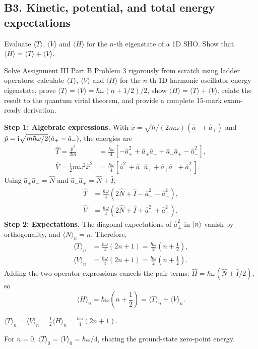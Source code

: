 \documentclass[11pt,a4paper]{article}
\newcommand{\key}[1]{\begin{resultbox}\centering\(\displaystyle #1\)\end{resultbox}}
\newcommand{\avg}[1]{\langle #1\rangle}\newcommand{\Sch}{Schr\"odinger}
\begin{document}
\subsection{B3. Kinetic, potential, and total energy expectations}
\begin{questionbox}
Evaluate \(\langle T\rangle\), \(\langle V\rangle\) and \(\langle H\rangle\) for the \(n\)-th eigenstate of a 1D SHO. Show that \(\langle H\rangle=\langle T\rangle+\langle V\rangle\).
\end{questionbox}
\begin{studybox}
Solve Assignment III Part B Problem 3 rigorously from scratch using ladder operators: calculate \(\langle T\rangle\), \(\langle V\rangle\) and \(\langle H\rangle\) for the \(n\)-th 1D harmonic oscillator energy eigenstate, prove \(\langle T\rangle=\langle V\rangle=\hbar\omega(n+1/2)/2\), show \(\langle H\rangle=\langle T\rangle+\langle V\rangle\), relate the result to the quantum virial theorem, and provide a complete 15-mark exam-ready derivation.
\end{studybox}
\textbf{Step 1: Algebraic expressions.} With
\(\hat x=\sqrt{\hbar/(2m\omega)}(\hat a_-+\hat a_+)\) and
\(\hat p=\mathrm{i}\sqrt{m\hbar\omega/2}(\hat a_+-\hat a_-)\), the energies are
\begin{align}
\hat T=\frac{\hat p^2}{2m}&=\frac{\hbar\omega}{4}\left[-\hat a_+^2+\hat a_+\hat a_-+\hat a_-\hat a_+-\hat a_-^2\right],\\
\hat V=\frac12m\omega^2\hat x^2&=\frac{\hbar\omega}{4}\left[\hat a_-^2+\hat a_-\hat a_++\hat a_+\hat a_-+\hat a_+^2\right].
\end{align}
Using \(\hat a_+\hat a_-=\hat N\) and \(\hat a_-\hat a_+=\hat N+\hat I\),
\begin{align}
\hat T&=\frac{\hbar\omega}{4}\left(2\hat N+\hat I-\hat a_-^2-\hat a_+^2\right),\\
\hat V&=\frac{\hbar\omega}{4}\left(2\hat N+\hat I+\hat a_-^2+\hat a_+^2\right).
\end{align}
\textbf{Step 2: Expectations.} The diagonal expectations of \(\hat a_\pm^2\) in \(|n\rangle\) vanish by orthogonality, and \(\avg N_n=n\). Therefore,
\begin{align}
\avg T_n&=\frac{\hbar\omega}{4}(2n+1)=\frac{\hbar\omega}{2}\left(n+\frac12\right),\\
\avg V_n&=\frac{\hbar\omega}{4}(2n+1)=\frac{\hbar\omega}{2}\left(n+\frac12\right).
\end{align}
Adding the two operator expressions cancels the pair terms:
\(\hat H=\hbar\omega(\hat N+\hat I/2)\), so
\begin{equation}\boxed{\avg H_n=\hbar\omega\left(n+\frac12\right)=\avg T_n+\avg V_n.}\end{equation}
\key{\boxed{\avg T_n=\avg V_n=\frac12\avg H_n=\frac{\hbar\omega}{4}(2n+1).}}
For \(n=0\), \(\avg T_0=\avg V_0=\hbar\omega/4\), sharing the ground-state zero-point energy.
\end{document}

